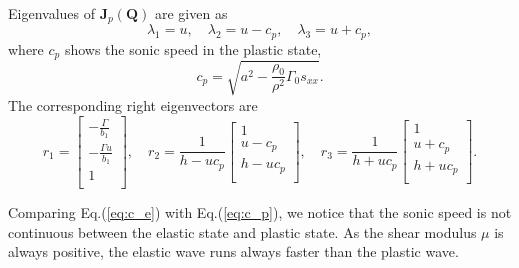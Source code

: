 \documentclass[review]{elsarticle}
\numberwithin{equation}{section}
\numberwithin{table}{section}
\begin{document}
Eigenvalues of $\mathbf{J}_p(\mathbf{Q})$ are given as
$$\lambda_1 = u,\quad \lambda_2 = u-c_p, \quad \lambda_3 = u+c_p,$$
where $c_p$ shows the sonic speed in the plastic state,  
\begin{equation}\label{eq:c_p}
   c_p = \sqrt{a^2-\frac{\rho_0}{\rho^2}\Gamma_0 s_{xx}}.
\end{equation}
The corresponding right eigenvectors are
\begin{equation}\label{eq:eivp}
  r_1 = \left[ \begin{array}{l}
	  -\frac{\Gamma}{b_1} \\
	  -\frac{\Gamma u}{b_1} \\
	  1\\
  \end{array}\right], \quad
  r_2 = \frac{1}{h-uc_p} \left[  \begin{array}{l}
	  1 \\
	  u-c_p \\
	  h-uc_p\\
  \end{array}\right], \quad
 r_3 = \frac{1}{h+uc_p}\left[ \begin{array}{l}
	  1 \\
	  u+c_p \\
	  h+uc_p\\
  \end{array}\right].
\end{equation}

Comparing Eq.(\ref{eq:c_e}) with Eq.(\ref{eq:c_p}), we notice that the sonic speed is not continuous between the elastic state and plastic state. As the shear modulus $\mu$ is always positive, the elastic wave runs always faster than the plastic wave.  %
\end{document}
